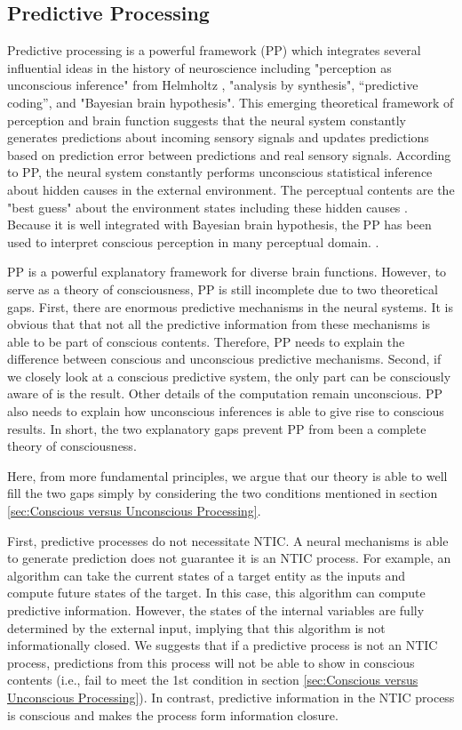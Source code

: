 \documentclass[utf8]{article}
\begin{document}
		\subsection{Predictive Processing}
    		Predictive processing is a powerful framework (PP) which integrates several influential ideas in the history of neuroscience including "perception as unconscious inference" from Helmholtz \citet{helmholtz1866concerning}, "analysis by synthesis", “predictive coding”, and "Bayesian brain hypothesis". This emerging theoretical framework of perception and brain function suggests that the neural system constantly generates predictions about incoming sensory signals and updates predictions based on prediction error between predictions and real sensory signals. According to PP, the neural system constantly performs unconscious statistical inference about hidden causes in the external environment. The perceptual contents are the "best guess" about the environment states including these hidden causes \citep{clark_2013, Hohwy2013}. Because it is well integrated with Bayesian brain hypothesis, the PP has been used to interpret conscious perception in many perceptual domain. \cite{Hohwy2013} \cite{SethPP2014}.
    		
    		
    		PP is a powerful explanatory framework for diverse brain functions. However, to serve as a theory of consciousness, PP is still incomplete due to two theoretical gaps. First, there are enormous predictive mechanisms in the neural systems. It is  obvious that that not all the predictive information from these mechanisms is able to be part of conscious contents. Therefore, PP needs to explain the difference between conscious and unconscious predictive mechanisms. Second, if we closely look at a conscious predictive system, the only part can be consciously aware of is the result. Other details of the computation remain unconscious. PP also needs to explain how unconscious inferences is able to give rise to conscious results. In short, the two explanatory gaps prevent PP from been a complete theory of consciousness. 
    		
    		Here, from more fundamental principles, we  argue that our theory is able to well fill the two gaps simply by considering the two conditions mentioned in section \ref{sec:Conscious versus Unconscious Processing}.
    		
    		First, predictive processes do not necessitate NTIC. A neural mechanisms is able to generate prediction does not guarantee it is an NTIC process. For example, an algorithm can take the current states of a target entity as the inputs and compute future states of the target. In this case, this algorithm can compute predictive information. However, the states of the internal variables are fully determined by the external input, implying that this algorithm is not informationally closed. We suggests that if a predictive process is not an NTIC process, predictions from this process will not be able to show in conscious contents (i.e., fail to meet the 1\lowercase{st} condition in section \ref{sec:Conscious versus Unconscious Processing}). In contrast, predictive information in the NTIC process is conscious and makes the process form information closure. 
    		
\end{document}
